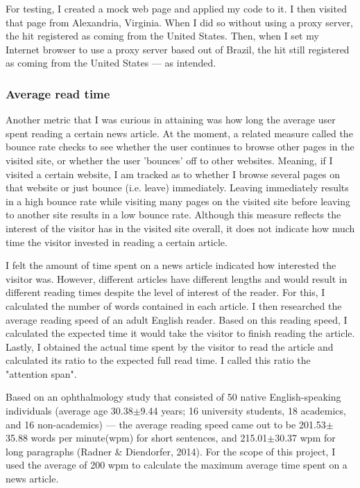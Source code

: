 \documentclass[12pt]{article}
\begin{document}
For testing, I created a mock web page and applied my code to it. I then visited that page from Alexandria, Virginia. When I did so without using a proxy server, the hit registered as coming from the United States. Then, when I set my Internet browser to use a proxy server based out of Brazil, the hit still registered as coming from the United States --- as intended.

\subsubsection{Average read time}

Another metric that I was curious in attaining was how long the average user spent reading a certain news article. At the moment, a related measure called the bounce rate checks to see whether the user continues to browse other pages in the visited site, or whether the user 'bounces' off to other websites. Meaning, if I visited a certain website, I am tracked as to whether I browse several pages on that website or just bounce (i.e. leave) immediately. Leaving immediately results in a high bounce rate while visiting many pages on the visited site before leaving to another site results in a low bounce rate. 
Although this measure reflects the interest of the visitor has in the visited site overall, it does not indicate how much time the visitor invested in reading a certain article. 

I felt the amount of time spent on a news article indicated how interested the visitor was. However, different articles have different lengths and would result in different reading times despite the level of interest of the reader. For this, I calculated the number of words contained in each article. I then researched the average reading speed of an adult English reader. Based on this reading speed, I calculated the expected time it would take the visitor to finish reading the article. Lastly, I obtained the actual time spent by the visitor to read the article and calculated its ratio to the expected full read time. I called this ratio the "attention span". 

Based on an ophthalmology study that consisted of 50 native English-speaking individuals (average age 30.38$\pm$9.44 years; 16 university students, 18 academics, and 16 non-academics) --- the average reading speed came out to be 201.53$\pm$35.88 words per minute(wpm) for short sentences, and 215.01$\pm$30.37 wpm for long paragraphs (Radner \& Diendorfer, 2014). For the scope of this project, I used the average of 200 wpm to calculate the maximum average time spent on a news article.  
\end{document}
